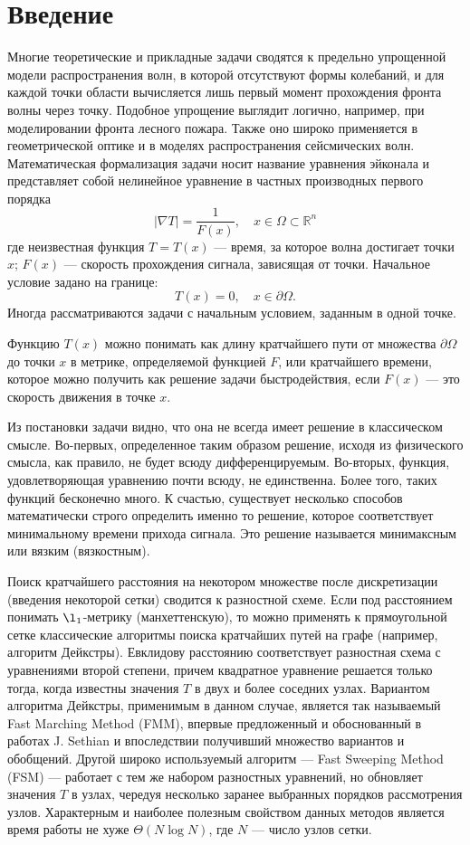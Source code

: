 \section*{Введение}
\label{intro}

Многие теоретические и прикладные задачи сводятся к предельно упрощенной модели распространения волн, 
в которой отсутствуют формы колебаний, и для каждой точки области вычисляется лишь первый момент прохождения 
фронта волны через точку. Подобное упрощение выглядит логично, например, при моделировании фронта лесного пожара. 
Также оно широко применяется в геометрической оптике и в моделях распространения сейсмических волн. 
Математическая формализация задачи носит название уравнения эйконала и представляет собой нелинейное уравнение 
в частных производных первого порядка
$$|\nabla T| = \frac{1}{F(x)}, \quad x \in \Omega \subset \mathbb{R}^n$$
где неизвестная функция $T=T(x)$ --- время, за которое волна достигает точки $x$; $F(x)$ --- скорость прохождения сигнала,
зависящая от точки. Начальное условие задано на границе:
$$ T(x) = 0, \quad x \in \partial \Omega. $$
Иногда рассматриваются задачи с  начальным условием, заданным в одной точке.

Функцию $T(x)$ можно понимать как длину кратчайшего пути от множества $\partial \Omega$ до точки $x$ в метрике, 
определяемой функцией $F$, или кратчайшего времени, которое можно получить как решение задачи быстродействия, если $F(x)$ 
--- это скорость движения в точке $x$.

Из постановки задачи видно, что она не всегда имеет решение в классическом смысле. Во-первых, определенное таким образом решение, 
исходя из физического смысла, как правило, не будет всюду дифференцируемым. Во-вторых, функция, удовлетворяющая 
уравнению почти всюду, не единственна. Более того, таких функций бесконечно много. К счастью, существует несколько способов математически 
строго определить именно то решение, которое соответствует минимальному времени прихода сигнала. Это решение называется минимаксным или 
вязким (вязкостным).

Поиск кратчайшего расстояния на некотором множестве после дискретизации (введения некоторой сетки) сводится к разностной схеме. 
Если под расстоянием понимать  $\l_1$-метрику (манхеттенскую), то можно применять к прямоугольной сетке классические алгоритмы 
поиска кратчайших путей на графе (например, алгоритм Дейкстры). Евклидову расстоянию соответствует разностная схема с уравнениями 
второй степени, причем квадратное уравнение решается только тогда, когда известны значения $T$ в двух и более соседних узлах.
Вариантом алгоритма Дейкстры, применимым в данном случае, является так называемый Fast Marching Method (FMM), впервые предложенный и обоснованный 
 в работах J. Sethian и впоследствии получивший множество вариантов и обобщений. Другой широко используемый алгоритм --- Fast Sweeping Method (FSM) 
 --- работает с тем же набором разностных уравнений, но обновляет значения $T$ в узлах, чередуя несколько заранее выбранных порядков рассмотрения узлов. 
 Характерным и наиболее полезным свойством данных методов является время работы не хуже $\Theta(N \log N)$, где $N$ --- число узлов сетки.
 

